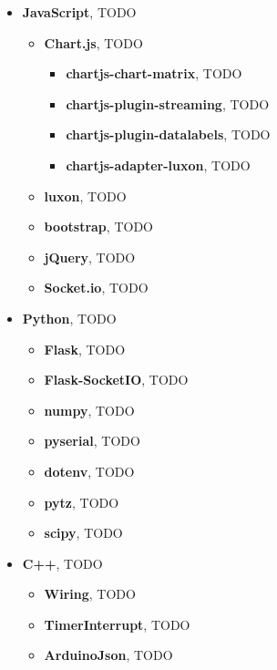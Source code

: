 \documentclass[12pt,a4paper,openright,twoside]{book}
\begin{document}
    \begin{itemize}
        \item \textbf{JavaScript}, TODO
        \begin{itemize}
            \item \textbf{Chart.js}, TODO
            \begin{itemize}
                \item \textbf{chartjs-chart-matrix}, TODO
                \item \textbf{chartjs-plugin-streaming}, TODO
                \item \textbf{chartjs-plugin-datalabels}, TODO
                \item \textbf{chartjs-adapter-luxon}, TODO
            \end{itemize}        
            \item \textbf{luxon}, TODO
            \item \textbf{bootstrap}, TODO
            \item \textbf{jQuery}, TODO
            \item \textbf{Socket.io}, TODO
        \end{itemize}
        \item \textbf{Python}, TODO
        \begin{itemize}
            \item \textbf{Flask}, TODO
            \item \textbf{Flask-SocketIO}, TODO
            \item \textbf{numpy}, TODO
            \item \textbf{pyserial}, TODO
            \item \textbf{dotenv}, TODO
            \item \textbf{pytz}, TODO
            \item \textbf{scipy}, TODO
        \end{itemize}
        \item \textbf{C++}, TODO
        \begin{itemize}
            \item \textbf{Wiring}, TODO
            \item \textbf{TimerInterrupt}, TODO
            \item \textbf{ArduinoJson}, TODO
        \end{itemize}        
    \end{itemize}
\end{document}
